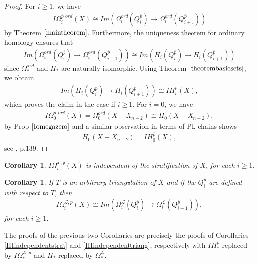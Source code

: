 \documentclass{scrreprt}
\newtheorem{corollar}[prop]{Corollary}
\begin{document}
\begin{proof}
For $i \geq 1$, we have 
\begin{align*}
 I\Omega_i^{\overline{p},ord}(X) \cong Im(\Omega_i^{ord}(Q_{i}^{\overline{p}}) \to \Omega_i^{ord}(Q_{i+1}^{\overline{p}}))
\end{align*}
by Theorem $\ref{maintheorem}$. Furthermore, the uniqueness theorem for ordinary homology ensures that
\begin{align*}
Im(\Omega_i^{ord}(Q_{i}^{\overline{p}}) \to \Omega_i^{ord}(Q_{i+1}^{\overline{p}})) \cong Im(H_i(Q_{i}^{\overline{p}}) \to H_i(Q_{i+1}^{\overline{p}}))
\end{align*}
since $\Omega_*^{ord}$ and $H_*$ are naturally isomorphic. Using Theorem $\ref{theorembasicsets}$, we obtain
\begin{align*}
Im(H_i(Q_{i}^{\overline{p}}) \to H_i(Q_{i+1}^{\overline{p}})) \cong IH_i^{\overline{p}}(X),
\end{align*}
which proves the claim in the case if $i \geq 1$. For $i=0$, we have
\begin{align*}
I\Omega_0^{\overline{p},ord}(X)=\Omega_0^{ord}(X-X_{n-2}) \cong H_0(X-X_{n-2}),
\end{align*}
by Prop $\ref{Iomegazero}$ and a similar observation in terms of PL chains shows 
\begin{align*}
 H_0(X-X_{n-2})=IH_0^{\overline{p}}(X),
\end{align*}
see \cite{GM}, p.139.
\end{proof}

\begin{corollar}
$I\Omega_i^{\mathcal{L}, \overline{p}}(X)$ is independent of the stratification of $X$, for each $i \geq 1$.
\end{corollar}

\begin{corollar}
If $T$ is an arbitrary triangulation of $X$ and if the $Q_i^{\overline{p}}$ are defined with respect to $T$, then
\begin{align*}
I\Omega_i^{\mathcal{L}, \overline{p}}(X)\cong Im(\Omega_i^{\mathcal{L}}(Q_{i}^{\overline{p}}) \to \Omega_i^{\mathcal{L}}(Q_{i+1}^{\overline{p}})),
\end{align*}
for each $i \geq 1$.
\end{corollar}

The proofs of the previous two Corollaries are precisely the proofs of Corollaries \ref{IHindependentstrat} and \ref{IHindependenttriang}, respectively with $IH_*^{\overline{p}}$ replaced by $I\Omega_*^{\mathcal{L}, \overline{p}}$ and $H_*$ replaced by $\Omega_*^{\mathcal{L}}$.
\end{document}
